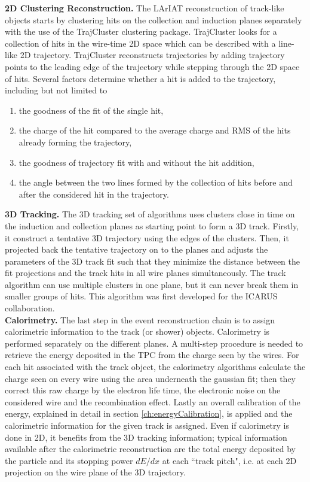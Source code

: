 \textbf{2D Clustering Reconstruction.} 
The LArIAT reconstruction of track-like objects starts by clustering hits on the collection and induction planes separately with the use of the TrajCluster clustering package\cite{Baller2016}. 
TrajCluster looks for a collection of hits in the wire-time 2D space which can be described with a line-like 2D trajectory. TrajCluster reconstructs trajectories by adding trajectory points to the leading edge of the trajectory while stepping through the 2D space of hits. Several factors determine whether a hit is added to the trajectory, including but not limited to
\begin{enumerate}
\item the goodness of the fit of the single hit,
\item the charge of the hit compared to the average charge and RMS of the hits already forming the trajectory,
\item the goodness of trajectory fit with and without the hit addition,
\item the angle between the two lines formed by the collection of hits before and after the considered hit in the trajectory.
\end{enumerate}

\textbf{3D Tracking.} The 3D tracking set of algorithms uses clusters close in time on the induction and collection planes as starting point to form a 3D track. Firstly, it construct a tentative 3D trajectory using the edges of the clusters. Then, it  projected back the tentative trajectory on to the planes and adjusts the parameters of the 3D track fit such that they minimize the distance between the fit projections and the track hits in all wire planes simultaneously.  The track algorithm can use multiple clusters in one plane, but it can never break them in smaller groups of hits. This algorithm was first developed for the ICARUS collaboration\cite{Antonello2013}.\\

\textbf{Calorimetry.} The last step in the event reconstruction chain is to assign calorimetric information to the track (or shower) objects. Calorimetry is performed separately on the different planes. A multi-step procedure is needed to retrieve the energy deposited in the TPC  from the charge seen by the wires.
For each hit associated with the track object, the calorimetry algorithms calculate the charge seen on every wire using the area underneath the gaussian fit; then they correct this raw charge by the electron life time, the electronic noise on the considered wire and the recombination effect. Lastly an overall calibration of the energy, explained in detail in section \ref{ch:energyCalibration}, is applied and the calorimetric information for the given track is assigned.
Even if calorimetry is done in 2D, it benefits from the 3D tracking information; typical information available after the calorimetric reconstruction are the total energy deposited by the particle and its stopping power $dE/dx$ at each ``track pitch", i.e. at each 2D projection on the wire plane of the 3D trajectory.



